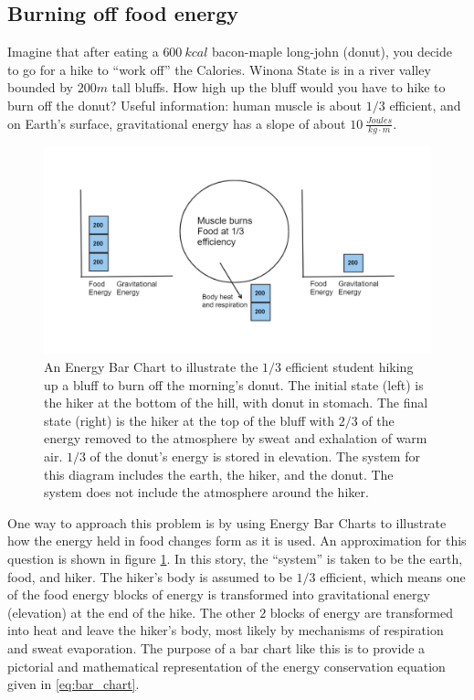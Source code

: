 \documentclass[12pt]{iopart}
\begin{document}
\subsection{Burning off food energy}
Imagine that after eating a $600~kcal$ bacon-maple long-john (donut), you decide to go for a hike to ``work off'' the Calories.  Winona State  is in a river valley bounded by $200m$ tall bluffs.  How high up the bluff would you have to hike to burn off the donut?  
Useful information: human muscle is about $1/3$ efficient, and on Earth's surface, gravitational energy has a slope of about $10~\frac{Joules}{kg\cdot m}$.

\begin{figure}[h]
\centering
\includegraphics[width=\columnwidth]{bar_chart.png}
\caption{An Energy Bar Chart to illustrate the $1/3$ efficient student hiking up a bluff to burn off the morning's donut.  The initial state (left) is the hiker at the bottom of the hill, with donut in stomach.  The final state (right) is the hiker at the top of the bluff with $2/3$ of the energy removed to the atmosphere by sweat and exhalation of warm air. $1/3$ of the donut's energy is stored in elevation.  The system for this diagram includes the earth, the hiker, and the donut.  The system does not include the atmosphere around the hiker.  
}
\label{bar_chart}
\end{figure}

One way to approach this problem is by using Energy Bar Charts \cite{energy_bar_charts} to illustrate how the energy held in food changes form as it is used.  An approximation for this question is shown in figure \ref{bar_chart}.  
In this story, the ``system'' is taken to be the earth, food, and hiker.  The hiker's body is assumed to be $1/3$ efficient, which means one of the food energy blocks of energy is transformed into gravitational energy (elevation) at the end of the hike.  
The other $2$ blocks of energy are transformed into heat and leave the hiker's body, most likely by mechanisms of respiration and sweat evaporation. The purpose of a bar chart like this is to provide a pictorial and mathematical representation of the energy conservation equation given in \ref{eq:bar_chart}.         
\end{document}
